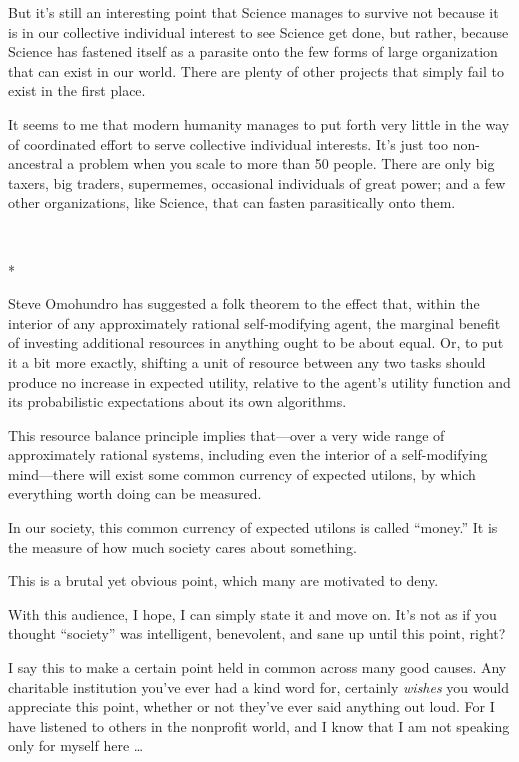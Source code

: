 {
 But it's still an interesting point that Science
manages to survive not because it is in our collective individual
interest to see Science get done, but rather, because Science has
fastened itself as a parasite onto the few forms of large organization
that can exist in our world. There are plenty of other projects that
simply fail to exist in the first place.}

{
 It seems to me that modern humanity manages to put forth very
little in the way of coordinated effort to serve collective individual
interests. It's just too non-ancestral a problem when
you scale to more than 50 people. There are only big taxers, big
traders, supermemes, occasional individuals of great power; and a few
other organizations, like Science, that can fasten parasitically onto
them.}

{\centering
 \ ~
\par}

{\centering
 *
\par}


{
 Steve Omohundro has suggested a folk theorem to the effect that,
within the interior of any approximately rational self-modifying agent,
the marginal benefit of investing additional resources in anything
ought to be about equal. Or, to put it a bit more exactly, shifting a
unit of resource between any two tasks should produce no increase in
expected utility, relative to the agent's utility
function and its probabilistic expectations about its own algorithms. }

{
 This resource balance principle implies that---over a very wide
range of approximately rational systems, including even the interior of
a self-modifying mind---there will exist some common currency of
expected utilons, by which everything worth doing can be measured.}

{
 In our society, this common currency of expected utilons is called
``money.'' It is the measure of how
much society cares about something.}

{
 This is a brutal yet obvious point, which many are motivated to
deny.}

{
 With this audience, I hope, I can simply state it and move on.
It's not as if you thought
``society'' was intelligent,
benevolent, and sane up until this point, right?}

{
 I say this to make a certain point held in common across many good
causes. Any charitable institution you've ever had a
kind word for, certainly \textit{wishes} you would appreciate this
point, whether or not they've ever said anything out
loud. For I have listened to others in the nonprofit world, and I know
that I am not speaking only for myself here \ldots}

